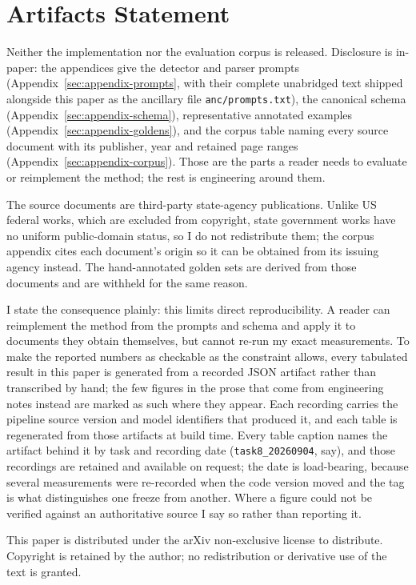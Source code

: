 \section{Artifacts Statement}
\label{sec:artifacts-statement}

Neither the implementation nor the evaluation corpus is released. Disclosure is
in-paper: the appendices give the detector and parser prompts
(Appendix~\ref{sec:appendix-prompts}, with their complete unabridged text
shipped alongside this paper as the ancillary file \texttt{anc/prompts.txt}),
the canonical schema
(Appendix~\ref{sec:appendix-schema}), representative annotated examples
(Appendix~\ref{sec:appendix-goldens}), and the corpus table naming every source
document with its publisher, year and retained page ranges
(Appendix~\ref{sec:appendix-corpus}). Those are the parts a reader needs to
evaluate or reimplement the method; the rest is engineering around them.

The source documents are third-party state-agency publications. Unlike US
federal works, which are excluded from copyright, state government works have
no uniform public-domain status, so I do not redistribute them; the corpus
appendix cites each document's origin so it can be obtained from its issuing
agency instead. The hand-annotated golden sets
are derived from those documents and are withheld for the same reason.

I state the consequence plainly: this limits direct reproducibility. A reader
can reimplement the method from the prompts and schema and apply it to documents
they obtain themselves, but cannot re-run my exact measurements. To make the
reported numbers as checkable as the constraint allows, every tabulated result
in this paper is generated from a recorded JSON artifact rather than transcribed
by hand; the few figures in the prose that come from engineering notes instead
are marked as such where they appear. Each recording carries the pipeline source version and model identifiers that
produced it, and each table is regenerated from those artifacts at build time.
Every table caption names the artifact behind it by task and recording date
(\texttt{task8\_20260904}, say), and those recordings are retained and
available on request; the date is load-bearing, because several measurements
were re-recorded when the code version moved and the tag is what distinguishes
one freeze from another. Where a figure could not be verified against an
authoritative source I say so rather than reporting it.

This paper is distributed under the arXiv non-exclusive license to distribute.
Copyright is retained by the author; no redistribution or derivative use of the
text is granted.
